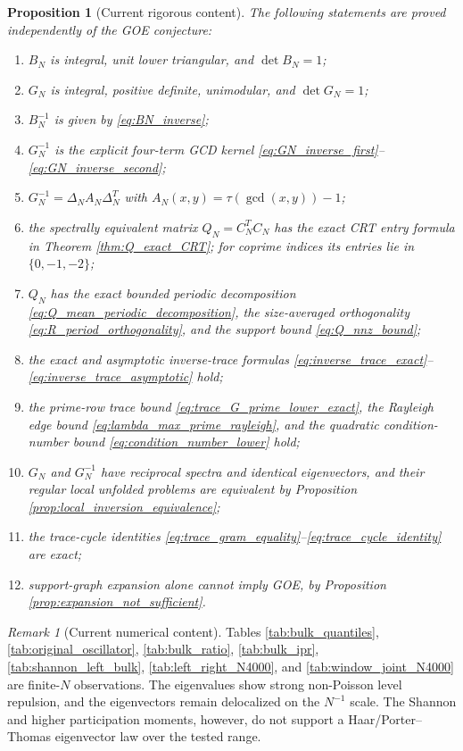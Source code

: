 \documentclass[11pt]{amsart}
\numberwithin{equation}{section}
\theoremstyle{plain}
\newtheorem{proposition}[theorem]{Proposition}
\theoremstyle{definition}
\theoremstyle{remark}
\newtheorem{remark}[theorem]{Remark}
\begin{document}
\begin{proposition}[Current rigorous content]
\label{prop:current_rigorous_content}
The following statements are proved independently of the GOE conjecture:
\begin{enumerate}[label=(\roman*)]
\item $B_N$ is integral, unit lower triangular, and $\det B_N=1$;
\item $G_N$ is integral, positive definite, unimodular, and $\det G_N=1$;
\item $B_N^{-1}$ is given by \eqref{eq:BN_inverse};
\item $G_N^{-1}$ is the explicit four-term GCD kernel \eqref{eq:GN_inverse_first}--\eqref{eq:GN_inverse_second};
\item $G_N^{-1}=\Delta_NA_N\Delta_N^T$ with $A_N(x,y)=\tau(\gcd(x,y))-1$;
\item the spectrally equivalent matrix $Q_N=C_N^TC_N$ has the exact CRT entry formula in Theorem \ref{thm:Q_exact_CRT}; for coprime indices its entries lie in $\{0,-1,-2\}$;
\item $Q_N$ has the exact bounded periodic decomposition \eqref{eq:Q_mean_periodic_decomposition}, the size-averaged orthogonality \eqref{eq:R_period_orthogonality}, and the support bound \eqref{eq:Q_nnz_bound};
\item the exact and asymptotic inverse-trace formulas \eqref{eq:inverse_trace_exact}--\eqref{eq:inverse_trace_asymptotic} hold;
\item the prime-row trace bound \eqref{eq:trace_G_prime_lower_exact}, the Rayleigh edge bound \eqref{eq:lambda_max_prime_rayleigh}, and the quadratic condition-number bound \eqref{eq:condition_number_lower} hold;
\item $G_N$ and $G_N^{-1}$ have reciprocal spectra and identical eigenvectors, and their regular local unfolded problems are equivalent by Proposition \ref{prop:local_inversion_equivalence};
\item the trace-cycle identities \eqref{eq:trace_gram_equality}--\eqref{eq:trace_cycle_identity} are exact;
\item support-graph expansion alone cannot imply GOE, by Proposition \ref{prop:expansion_not_sufficient}.
\end{enumerate}
\end{proposition}

\begin{remark}[Current numerical content]
\label{rem:current_numerical_content}
Tables \ref{tab:bulk_quantiles}, \ref{tab:original_oscillator}, \ref{tab:bulk_ratio}, \ref{tab:bulk_ipr}, \ref{tab:shannon_left_bulk}, \ref{tab:left_right_N4000}, and \ref{tab:window_joint_N4000} are finite-$N$ observations.  The eigenvalues show strong non-Poisson level repulsion, and the eigenvectors remain delocalized on the $N^{-1}$ scale.  The Shannon and higher participation moments, however, do not support a Haar/Porter--Thomas eigenvector law over the tested range.
\end{remark}
\end{document}
